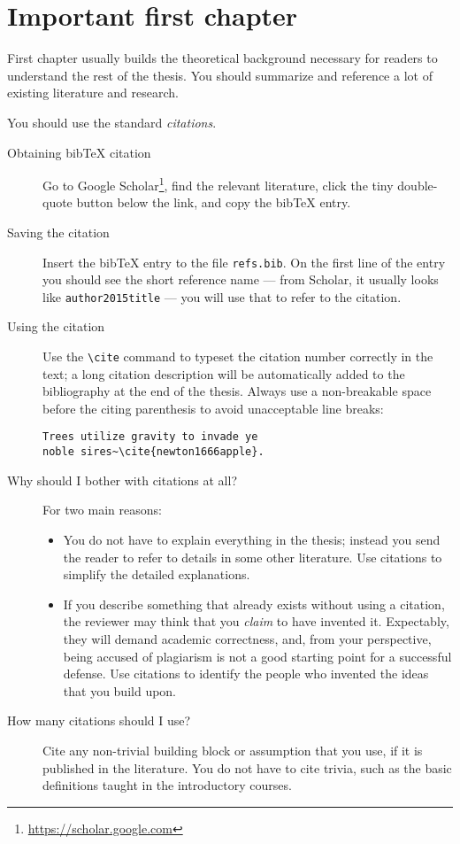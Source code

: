\chapter{Important first chapter}
\label{chap:refs}

First chapter usually builds the theoretical background necessary for readers to understand the rest of the thesis. You should summarize and reference a lot of existing literature and research.

You should use the standard \emph{citations}.

\begin{description}
\item[Obtaining bibTeX citation] Go to Google Scholar\footnote{\url{https://scholar.google.com}}, find the relevant literature, click the tiny double-quote button below the link, and copy the bibTeX entry.
\item[Saving the citation] Insert the bibTeX entry to the file \texttt{refs.bib}. On the first line of the entry you should see the short reference name --- from Scholar, it usually looks like \texttt{author2015title} --- you will use that to refer to the citation.
\item[Using the citation] Use the \verb|\cite| command to typeset the citation number correctly in the text; a long citation description will be automatically added to the bibliography at the end of the thesis. Always use a non-breakable space before the citing parenthesis to avoid unacceptable line breaks:
\begin{Verbatim}
Trees utilize gravity to invade ye
noble sires~\cite{newton1666apple}.
\end{Verbatim}
\item[Why should I bother with citations at all?] For two main reasons:
\begin{itemize}
\item You do not have to explain everything in the thesis; instead you send the reader to refer to details in some other literature. Use citations to simplify the detailed explanations.
\item If you describe something that already exists without using a citation, the reviewer may think that you \emph{claim} to have invented it. Expectably, they will demand academic correctness, and, from your perspective, being accused of plagiarism is not a good starting point for a successful defense. Use citations to identify the people who invented the ideas that you build upon.
\end{itemize}
\item[How many citations should I use?]
Cite any non-trivial building block or assumption that you use, if it is published in the literature. You do not have to cite trivia, such as the basic definitions taught in the introductory courses.


\end{description}
